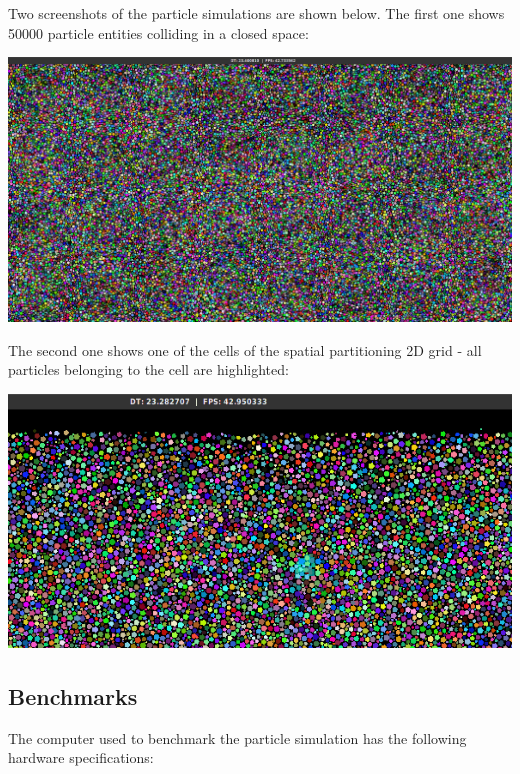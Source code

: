 \documentclass[oneside, 12pt, a4paper, openany]{book}
\let\origfigure=\figure
\let\endorigfigure=\endfigure
\renewenvironment{figure}[1][]{%
\origfigure[H]
}{%
\endorigfigure
}
\begin{document}
Two screenshots of the particle simulations are shown below. The first
one shows 50000 particle entities colliding in a closed space:

\begin{figure}
\centering
\includegraphics{source/figures/bench/sc0.png}
\caption{Particle simulation: screenshot - 50000 colliding particles}
\end{figure}

The second one shows one of the cells of the spatial partitioning 2D
grid - all particles belonging to the cell are highlighted:

\begin{figure}
\centering
\includegraphics{source/figures/bench/sc1.png}
\caption{Particle simulation: screenshot - spatial partitioning cell}
\end{figure}

\hypertarget{bench_particlesim}{\subsection{Benchmarks}\label{bench_particlesim}}

The computer used to benchmark the particle simulation has the following
hardware specifications:
\end{document}
